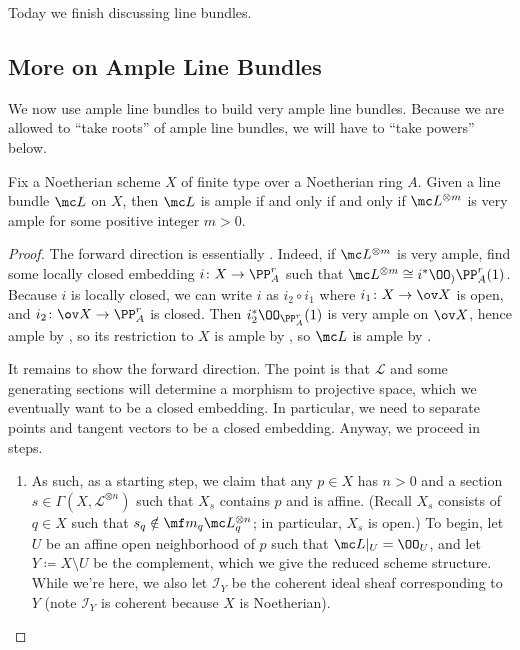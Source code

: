 \documentclass[../notes.tex]{subfiles}
\begin{document}
Today we finish discussing line bundles.

\subsection{More on Ample Line Bundles}
We now use ample line bundles to build very ample line bundles. Because we are allowed to ``take roots'' of ample line bundles, we will have to ``take powers'' below.
\begin{proposition} \label{prop:power-ample-is-very-ample}
	Fix a Noetherian scheme $X$ of finite type over a Noetherian ring $A$. Given a line bundle $\mc L$ on $X$, then $\mc L$ is ample if and only if and only if $\mc L^{\otimes m}$ is very ample for some positive integer $m>0$.
\end{proposition}
\begin{proof}
	The forward direction is essentially . Indeed, if $\mc L^{\otimes m}$ is very ample, find some locally closed embedding $i\colon X\to\PP^r_A$ such that $\mc L^{\otimes m}\cong i^*\OO_){\PP^r_A}(1)$. Because $i$ is locally closed, we can write $i$ as $i_2\circ i_1$ where $i_1\colon X\to\ov X$ is open, and $i_2\colon\ov X\to\PP^r_A$ is closed. Then $i_2^*\OO_{\PP^r_A}(1)$ is very ample on $\ov X$, hence ample by , so its restriction to $X$ is ample by , so $\mc L$ is ample by .

	It remains to show the forward direction. The point is that $\mathcal L$ and some generating sections will determine a morphism to projective space, which we eventually want to be a closed embedding. In particular, we need to separate points and tangent vectors to be a closed embedding. Anyway, we proceed in steps.
	\begin{enumerate}
		\item As such, as a starting step, we claim that any $p\in X$ has $n>0$ and a section $s\in\Gamma\left(X,\mathcal L^{\otimes n}\right)$ such that $X_s$ contains $p$ and is affine. (Recall $X_s$ consists of $q\in X$ such that $s_q\notin\mf m_q\mc L^{\otimes n}_q$; in particular, $X_s$ is open.) To begin, let $U$ be an affine open neighborhood of $p$ such that $\mc L|_U=\OO_U$, and let $Y\coloneqq X\setminus U$ be the complement, which we give the reduced scheme structure. While we're here, we also let $\mathcal I_Y$ be the coherent ideal sheaf corresponding to $Y$ (note $\mathcal I_Y$ is coherent because $X$ is Noetherian).


\end{enumerate}
\end{proof}
\end{document}

